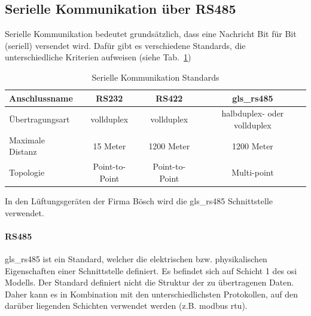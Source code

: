 \subsection{Serielle Kommunikation über RS485}
Serielle Kommunikation bedeutet grundsätzlich, dass eine Nachricht Bit für Bit (seriell) versendet wird. \cite[vgl.][]{Schnabel:o.J.} Dafür gibt es verschiedene Standards, die unterschiedliche Kriterien aufweisen (siehe Tab.~\ref{tab:serielle}) 
\begin{table}[H]
	\caption{Serielle Kommunikation Standards \label{tab:serielle}}
	\begin{tabularx}{\textwidth}{@{}X|c|c|c@{}}
		\toprule
		\textbf{Anschlussname} & \textbf{RS232} & \textbf{RS422} & \textbf{\gls{gls_rs485}}\\
		\midrule
		Übertragungsart & \gls{vollduplex} & \gls{vollduplex} & \gls{halbduplex}- oder \gls{vollduplex} \\
		Maximale Distanz & 15 Meter & 1200 Meter & 1200 Meter \\
		Topologie & Point-to-Point & Point-to-Point & Multi-point \\
		\bottomrule
	\end{tabularx}
\end{table}
\cite[vgl.][]{IPC2U_GmbH_SerielleSchnittstellen:o.J.}

In den Lüftungsgeräten der Firma Bösch wird die \gls{gls_rs485} Schnittstelle verwendet.

\paragraph{RS485} \label{rs485}
\gls{gls_rs485} ist ein Standard, welcher die elektrischen bzw. physikalischen Eigenschaften einer Schnittstelle definiert. Es befindet sich auf Schicht 1 des \gls{osi} Modells. Der Standard definiert nicht die Struktur der zu übertragenen Daten. Daher kann es in Kombination mit den unterschiedlichsten Protokollen, auf den darüber liegenden Schichten verwendet werden (z.B. \gls{modbus} \acs{rtu}). \cite[vgl.][]{Janitza:o.J.}


